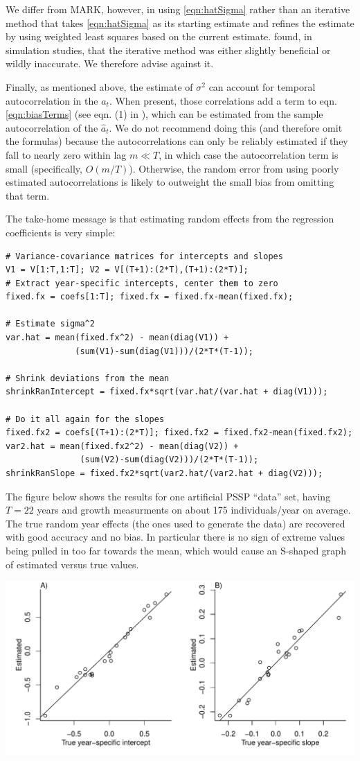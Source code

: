 \documentclass[12pt]{article}
\begin{document}
We differ from MARK, however, in using \eqref{eqn:hatSigma} rather than an iterative method that takes \eqref{eqn:hatSigma} as its 
starting estimate and refines the estimate by using weighted least squares based on the current estimate. 
\citet{metcalf-etal-2015} found, in simulation studies, that the iterative method was either slightly beneficial 
or wildly inaccurate. We therefore advise against it. 

Finally, as mentioned above, the estimate of $\sigma^2$ can account for temporal autocorrelation in the $a_t$. 
When present, those correlations add a term to eqn. \eqref{eqn:biasTerms} (see eqn. (1) in \citet{gould-nichols-1998}), 
which can be estimated from the sample autocorrelation of the $\hat{a}_t$. We do not recommend doing this (and therefore omit
the formulas) because the autocorrelations can only be reliably estimated if they fall to nearly zero within lag $m \ll T$, in which
case the autocorrelation term is small (specifically, $O(m/T)$). Otherwise, the random error from using poorly estimated 
autocorrelations is likely to outweight the small bias from omitting that term. 

The take-home message is that estimating random effects from the regression coefficients is very simple: 
\begin{lstlisting}
# Variance-covariance matrices for intercepts and slopes
V1 = V[1:T,1:T]; V2 = V[(T+1):(2*T),(T+1):(2*T)]; 
# Extract year-specific intercepts, center them to zero   
fixed.fx = coefs[1:T]; fixed.fx = fixed.fx-mean(fixed.fx); 

# Estimate sigma^2
var.hat = mean(fixed.fx^2) - mean(diag(V1)) + 
              (sum(V1)-sum(diag(V1)))/(2*T*(T-1)); 

# Shrink deviations from the mean 
shrinkRanIntercept = fixed.fx*sqrt(var.hat/(var.hat + diag(V1)));

# Do it all again for the slopes 
fixed.fx2 = coefs[(T+1):(2*T)]; fixed.fx2 = fixed.fx2-mean(fixed.fx2); 
var2.hat = mean(fixed.fx2^2) - mean(diag(V2)) + 
               (sum(V2)-sum(diag(V2)))/(2*T*(T-1)); 
shrinkRanSlope = fixed.fx2*sqrt(var2.hat/(var2.hat + diag(V2))); 
\end{lstlisting}

The figure below shows the results for one artificial PSSP ``data'' set, having $T=22$ years and growth measurments on 
about 175 individuals/year on average. The true random year effects (the ones used to generate the data) are recovered
with good accuracy and no bias. In particular there is no sign of extreme values being pulled in too far
towards the mean, which would cause an S-shaped graph of estimated versus true values. 

\bigskip 

\centerline{\includegraphics[width=\textwidth]{figures/SimpleShrinkage.pdf}}

  
\end{document}
